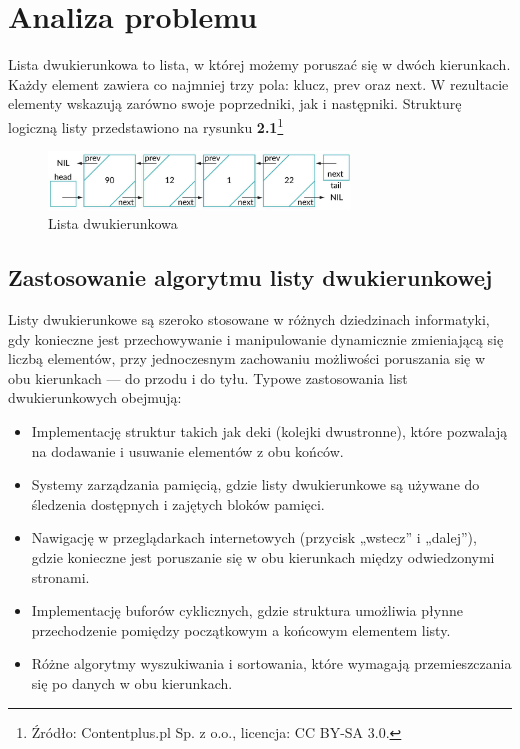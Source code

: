 \newpage
\section{Analiza problemu}		%
\hspace{0.60cm}
Lista dwukierunkowa to lista, w której możemy poruszać się w dwóch kierunkach.
Każdy element zawiera co najmniej trzy pola: klucz, prev oraz next. W rezultacie
elementy wskazują zarówno swoje poprzedniki, jak i następniki. Strukturę logiczną listy przedstawiono na rysunku
\textbf{2.1}\footnote{Źródło: Contentplus.pl Sp. z o.o., licencja: CC BY-SA 3.0.}

\begin{figure}[!htb]
  \begin{center}
    \includegraphics[width=8cm]{rys/lista-dwukierunkowa.png}
    \caption{Lista dwukierunkowa}\label{rys:lista_dwukierunkowa}
  \end{center}
\end{figure}

\subsection{Zastosowanie algorytmu listy dwukierunkowej\cite{ZPE}}

Listy dwukierunkowe są szeroko stosowane w różnych dziedzinach informatyki, gdy konieczne jest przechowywanie i manipulowanie dynamicznie zmieniającą się liczbą elementów, przy jednoczesnym zachowaniu możliwości poruszania się w obu kierunkach — do przodu i do tyłu. Typowe zastosowania list dwukierunkowych obejmują:

\begin{itemize}
  \item Implementację struktur takich jak deki (kolejki dwustronne), które pozwalają na dodawanie i usuwanie elementów z obu końców.
  \item Systemy zarządzania pamięcią, gdzie listy dwukierunkowe są używane do śledzenia dostępnych i zajętych bloków pamięci.
  \item Nawigację w przeglądarkach internetowych (przycisk „wstecz” i „dalej”), gdzie konieczne jest poruszanie się w obu kierunkach między odwiedzonymi stronami.
  \item Implementację buforów cyklicznych, gdzie struktura umożliwia płynne przechodzenie pomiędzy początkowym a końcowym elementem listy.
  \item Różne algorytmy wyszukiwania i sortowania, które wymagają przemieszczania się po danych w obu kierunkach.
\end{itemize}


